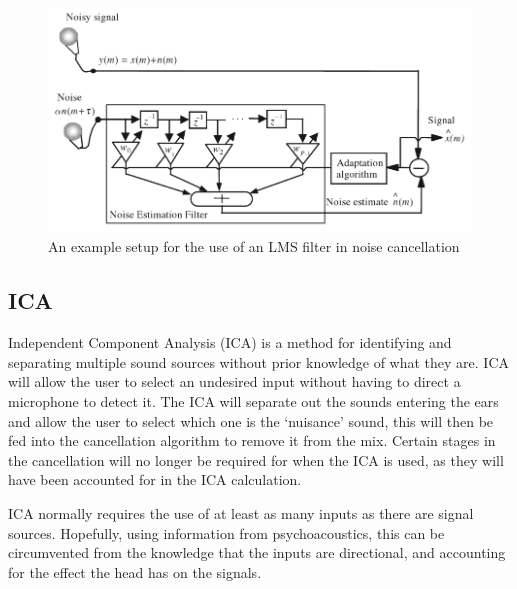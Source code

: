 \begin{figure}[H]
	\centering
	\includegraphics[width=\textwidth]{./img/lmsfilter.png}
	\caption{An example setup for the use of an LMS filter in noise cancellation \cite{AdvancedDSPing}}
	\label{fig:lmsfilter}
\end{figure}

\subsection{ICA}
Independent Component Analysis (ICA) is a method for identifying and separating multiple sound sources without prior knowledge of what they are.
ICA will allow the user to select an undesired input without having to direct a microphone to detect it.
The ICA will separate out the sounds entering the ears and allow the user to select which one is the `nuisance' sound, this will then be fed into the cancellation algorithm to remove it from the mix.
Certain stages in the cancellation will no longer be required for when the ICA is used, as they will have been accounted for in the ICA calculation.

ICA normally requires the use of at least as many inputs as there are signal sources\cite{AdvancedDSPing}.
Hopefully, using information from psychoacoustics, this can be circumvented from the knowledge that the inputs are directional, and accounting for the effect the head has on the signals.

